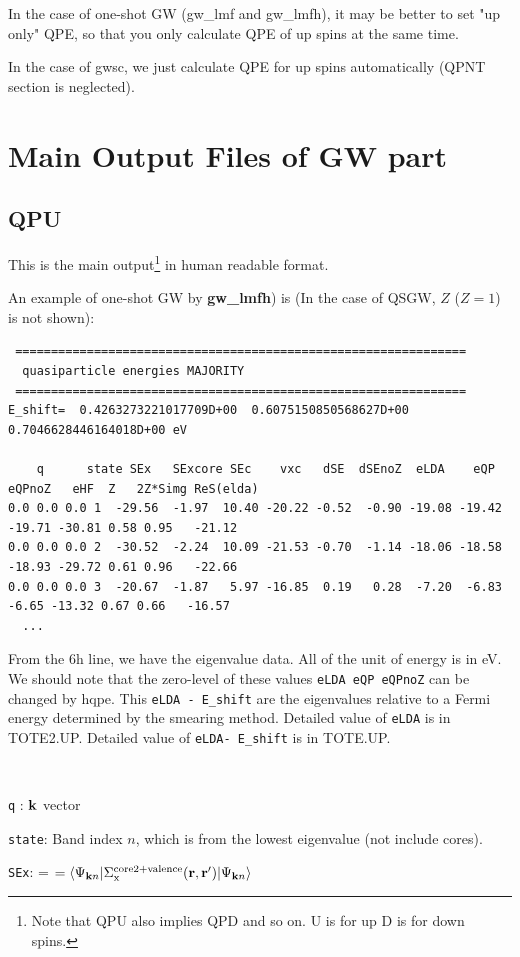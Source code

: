 \documentclass[a4paper,10pt,epsf,fleqn]{article}
\newcommand{\fx}[1]{\subsection{\sf #1\index{\sf #1}}}
\newcommand{\exe}[1]{{\bf #1}\index{#1}}
\begin{document}
{In the case of one-shot GW (gw\_lmf and gw\_lmfh),
it may be better to set "up only" QPE,
so that you only calculate QPE of up spins at the same time.

In the case of gwsc, we just calculate QPE for up spins
automatically (QPNT section is neglected).



\newpage
\section{Main Output Files of GW part}

\label{mainoutput}
\fx{QPU}
This is the main output\footnote{Note that QPU also implies QPD and so
on. U is for up D is for down spins.} in 
human readable format. 

An example of one-shot GW by \exe{gw\_lmfh}) is 
(In the case of QSGW, $Z$ ($Z=1$) is not shown):
{\baselineskip=2.6mm \small
\begin{verbatim} 
 ===============================================================
  quasiparticle energies MAJORITY
 ===============================================================
E_shift=  0.4263273221017709D+00  0.6075150850568627D+00  0.7046628446164018D+00 eV

    q      state SEx   SExcore SEc    vxc   dSE  dSEnoZ  eLDA    eQP  eQPnoZ   eHF  Z   2Z*Simg ReS(elda)
0.0 0.0 0.0 1  -29.56  -1.97  10.40 -20.22 -0.52  -0.90 -19.08 -19.42 -19.71 -30.81 0.58 0.95   -21.12
0.0 0.0 0.0 2  -30.52  -2.24  10.09 -21.53 -0.70  -1.14 -18.06 -18.58 -18.93 -29.72 0.61 0.96   -22.66
0.0 0.0 0.0 3  -20.67  -1.87   5.97 -16.85  0.19   0.28  -7.20  -6.83  -6.65 -13.32 0.67 0.66   -16.57
  ...
\end{verbatim}}
From the 6h line, we have the eigenvalue data. All of the unit of energy is in eV.
We should note that the zero-level of these values {\tt eLDA  eQP eQPnoZ} can be changed  by hqpe.
This {\tt eLDA - E\_shift} are the eigenvalues relative to a Fermi energy determined by the smearing method.
Detailed value of {\tt eLDA} is in {\sf TOTE2.UP}.
Detailed value of {\tt eLDA- E\_shift} is in {\sf TOTE.UP}.

\ 

{\tt q}  : ${\bf k}$ vector

{\tt state}: Band index $n$, which is from the lowest eigenvalue (not include cores).

{\tt SEx}: = $= \langle\Psi_{{\bf k}n}|\Sigma_{\rm x}^{\rm core2+valence}({\bf r},{\bf r}^{\prime})|\Psi_{{\bf k}n}\rangle$

}
\end{document}
